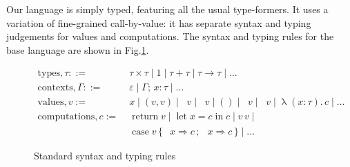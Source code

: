 \documentclass[acmsmall, screen, review, anonymous]{acmart}
\theoremstyle{definition}
\newcommand{\seq}{\,;\,}
\newcommand{\fst}{\mathop{\pi_1}}
\newcommand{\snd}{\mathop{\pi_2}}
\newcommand{\inl}[1]{\mathop{\mathrm{in}_L} #1}
\newcommand{\inr}[1]{\mathop{\mathrm{in}_R} #1}
\newcommand{\case}[5]{\mathop{\mathrm{case}} #1 \,\{\,\inl{#2} \Rightarrow #3 \seq \inr{#4} \Rightarrow #5 \,\}}
\newcommand{\abs}[3]{\mathop{\lambda}(#1 \types #2).\,#3}
\newcommand{\app}[2]{#1\,#2}
\newcommand{\types}{\mathrel{:}}
\newcommand{\cempty}{\varepsilon}
\newcommand{\ccons}[2]{#1;\,#2}
\newcommand{\lbind}[3]{\ccons{#1}{#2\types#3}}
\newcommand{\return}[1]{\mathop{\mathrm{return}} #1}
\newcommand{\letv}[3]{\mathop{\mathrm{let}} #1 = #2 \mathop{\mathrm{in}} #3}
\newcommand{\turnv}{\mathrel{\vdash_V}}
\newcommand{\turnc}{\mathrel{\vdash_C}}
\begin{document}
Our language is simply typed, featuring all the usual type-formers. It
uses a variation of fine-grained call-by-value: it has separate syntax
and typing judgements for values and computations. The syntax and typing
rules for the base language are shown in Fig.\ref{fig:typing-standard}.
\begin{figure}
\begin{align*}
  \mathrm{types}, \tau ::=\;& \tau \times \tau \mid 1 \mid \tau + \tau
                              \mid \tau \rightarrow \tau \mid \ldots \\
  \mathrm{contexts}, \Gamma ::=\;& \cempty \mid \lbind{\Gamma}{x}{\tau} \mid \ldots \\
  \mathrm{values}, v :=\;& x \mid (v, v) \mid \fst v \mid \snd v
                           \mid () \mid \inl{v} \mid \inr{v} \mid \abs{x}{\tau}{c} \mid \ldots \\
  \mathrm{computations}, c :=\;& \return{v} \mid \letv{x}{c}{c}
                                 \mid \app{v}{v} \mid \\
                            & \case{v}{x}{c}{x}{c} \mid \ldots
\end{align*}
\caption{Standard syntax and typing rules}
\label{fig:typing-standard}
\end{figure}
\end{document}
